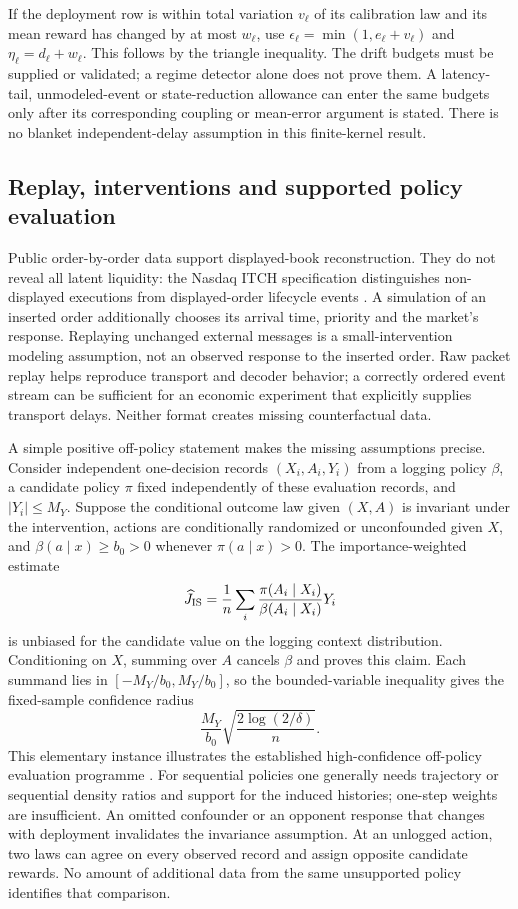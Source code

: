 If the deployment row is within total variation $v_\ell$ of its calibration
law and its mean reward has changed by at most $w_\ell$, use
$\epsilon_\ell=\min(1,e_\ell+v_\ell)$ and
$\eta_\ell=d_\ell+w_\ell$. This follows by the triangle inequality.
The drift budgets must be supplied or validated; a regime detector alone
does not prove them. A latency-tail, unmodeled-event or state-reduction
allowance can enter the same budgets only after its corresponding coupling
or mean-error argument is stated. There is no blanket independent-delay
assumption in this finite-kernel result.

\subsection{Replay, interventions and supported policy evaluation}

Public order-by-order data support displayed-book reconstruction. They do
not reveal all latent liquidity: the Nasdaq ITCH specification distinguishes
non-displayed executions from displayed-order lifecycle events
\citep{itch}. A simulation of an inserted order additionally chooses
its arrival time, priority and the market's response. Replaying unchanged
external messages is a small-intervention modeling assumption, not an
observed response to the inserted order. Raw packet replay helps reproduce
transport and decoder behavior; a correctly ordered event stream can be
sufficient for an economic experiment that explicitly supplies transport
delays. Neither format creates missing counterfactual data.

A simple positive off-policy statement makes the missing assumptions
precise. Consider independent one-decision records $(X_i,A_i,Y_i)$ from a
logging policy $\beta$, a candidate policy $\pi$ fixed independently of
these evaluation records, and $|Y_i|\le M_Y$. Suppose the conditional
outcome law given $(X,A)$ is invariant under the intervention, actions
are conditionally randomized or unconfounded given $X$, and
$\beta(a\mid x)\ge b_0>0$ whenever $\pi(a\mid x)>0$.
The importance-weighted estimate
\[
 \widehat J_{\rm IS}=\frac1n\sum_i
 \frac{\pi(A_i\mid X_i)}{\beta(A_i\mid X_i)}Y_i
\]
is unbiased for the candidate value on the logging context distribution.
Conditioning on $X$, summing over $A$ cancels $\beta$ and proves this claim.
Each summand lies in $[-M_Y/b_0,M_Y/b_0]$, so the bounded-variable inequality
gives the fixed-sample confidence radius
\[
 \frac{M_Y}{b_0}\sqrt{\frac{2\log(2/\delta)}{n}}.
\]
This elementary instance illustrates the established high-confidence
off-policy evaluation programme \citep{DeployThomas2015}. For sequential
policies one generally needs trajectory or sequential density ratios and
support for the induced histories; one-step weights are insufficient.
An omitted confounder or an opponent response that changes with deployment
invalidates the invariance assumption. At an unlogged action, two laws
can agree on every observed record and assign opposite candidate rewards.
No amount of additional data from the same unsupported policy identifies
that comparison.
